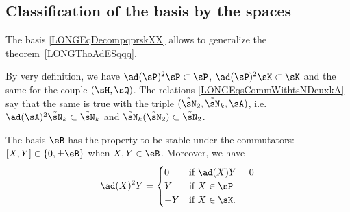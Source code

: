%
\subsection{Classification of the basis by the spaces}
%

The basis \eqref{LONGEqDecompqprskXX} allows to generalize the theorem~\ref{LONGThoAdESqqq}.

By very definition, we have $\ad(\sP)^2\sP\subset\sP$, $\ad(\sP)^2\sK\subset\sK$ and the same for the couple $(\sH,\sQ)$. The relations \eqref{LONGEqsCommWithtsNDeuxkA} say that the same is true with the triple $(\tilde\sN_2,\tilde\sN_k,\sA)$, i.e. $\ad(\sA)^2\tilde\sN_k\subset\tilde\sN_k$ and $\tilde\sN_k(\tilde\sN_2)\subset\tilde\sN_2$.

\begin{theorem}		\label{LONGThoAdSqIouZero}
	The basis $\eB$ has the property to be stable under the commutators: $[X,Y]\in\{0,\pm\eB\}$ when $X,Y\in\eB$. Moreover, we have
	\begin{equation}		\label{LONGEqadXsqYzYmY}
		\ad(X)^2Y=\begin{cases}
			0	&	\text{if }\ad(X)Y=0\\
			Y	&	\text{if }X\in\sP\\
			-Y	&	 \text{if }X\in\sK.
		\end{cases}
	\end{equation}
\end{theorem}

